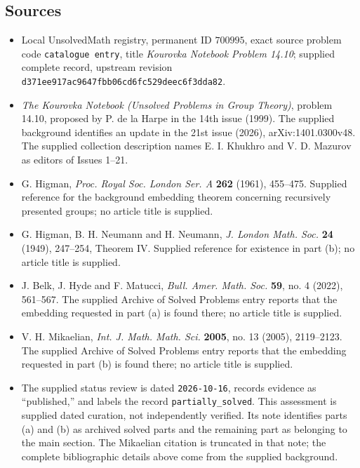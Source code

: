\documentclass[11pt]{article}
\begin{document}
\subsection{Sources}
\begin{itemize}
\item Local UnsolvedMath registry, permanent ID $700995$, exact source problem code \texttt{catalogue entry}, title \emph{Kourovka Notebook Problem 14.10}; supplied complete record, upstream revision \texttt{d371ee917ac9647fbb06cd6fc529deec6f3dda82}.
\item \emph{The Kourovka Notebook (Unsolved Problems in Group Theory)}, problem 14.10, proposed by P. de la Harpe in the 14th issue (1999). The supplied background identifies an update in the 21st issue (2026), arXiv:1401.0300v48. The supplied collection description names E. I. Khukhro and V. D. Mazurov as editors of Issues 1--21.
\item G. Higman, \emph{Proc. Royal Soc. London Ser. A} \textbf{262} (1961), 455--475. Supplied reference for the background embedding theorem concerning recursively presented groups; no article title is supplied.
\item G. Higman, B. H. Neumann and H. Neumann, \emph{J. London Math. Soc.} \textbf{24} (1949), 247--254, Theorem IV. Supplied reference for existence in part (b); no article title is supplied.
\item J. Belk, J. Hyde and F. Matucci, \emph{Bull. Amer. Math. Soc.} \textbf{59}, no. 4 (2022), 561--567. The supplied Archive of Solved Problems entry reports that the embedding requested in part (a) is found there; no article title is supplied.
\item V. H. Mikaelian, \emph{Int. J. Math. Math. Sci.} \textbf{2005}, no. 13 (2005), 2119--2123. The supplied Archive of Solved Problems entry reports that the embedding requested in part (b) is found there; no article title is supplied.
\item The supplied status review is dated \texttt{2026-10-16}, records evidence as ``published,'' and labels the record \texttt{partially\_solved}. This assessment is supplied dated curation, not independently verified. Its note identifies parts (a) and (b) as archived solved parts and the remaining part as belonging to the main section. The Mikaelian citation is truncated in that note; the complete bibliographic details above come from the supplied background.
\end{itemize}
\end{document}
